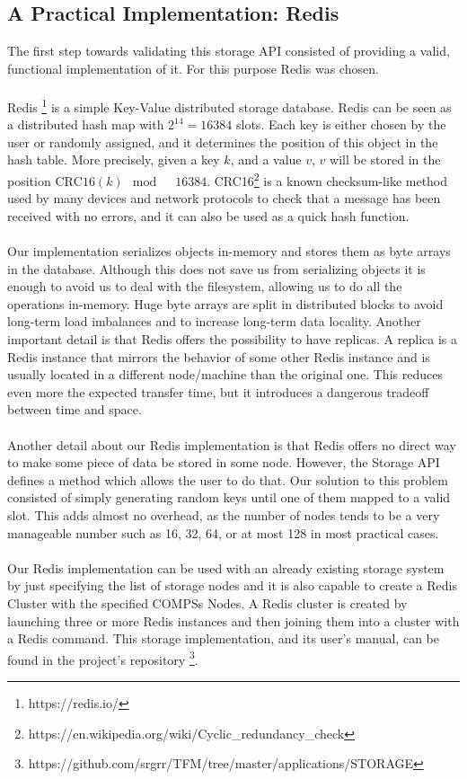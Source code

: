 \subsection{A Practical Implementation: Redis}
\label{subsec:storage_redis}
The first step towards validating this storage API consisted of providing a valid, functional implementation of it. For this purpose Redis was chosen.\\
\\
Redis \footnote{https://redis.io/} is a simple Key-Value distributed storage database. Redis can be seen as a distributed hash map with $2^{14} = 16384$ slots. Each key is either chosen by the user or randomly assigned, and it determines the position of this object in the hash table. More precisely, given a key $k$, and a value $v$, $v$ will be stored in the position $\textrm{CRC16}(k) \mod \quad 16384$. CRC16\footnote{https://en.wikipedia.org/wiki/Cyclic\_redundancy\_check} is a known checksum-like method used by many devices and network protocols to check that a message has been received with no errors, and it can also be used as a quick hash function.\\
\\
Our implementation serializes objects in-memory and stores them as byte arrays in the database. Although this does not save us from serializing objects it is enough to avoid us to deal with the filesystem, allowing us to do all the operations in-memory. Huge byte arrays are split in distributed blocks to avoid long-term load imbalances and to increase long-term data locality. Another important detail is that Redis offers the possibility to have replicas. A replica is a Redis instance that mirrors the behavior of some other Redis instance and is usually located in a different node/machine than the original one. This reduces even more the expected transfer time, but it introduces a dangerous tradeoff between time and space.\\
\\
Another detail about our Redis implementation is that Redis offers no direct way to make some piece of data be stored in some node. However, the Storage API defines a method which allows the user to do that. Our solution to this problem consisted of simply generating random keys until one of them mapped to a valid slot. This adds almost no overhead, as the number of nodes tends to be a very manageable number such as 16, 32, 64, or at most 128 in most practical cases.\\
\\
Our Redis implementation can be used with an already existing storage system by just specifying the list of storage nodes and it is also capable to create a Redis Cluster with the specified COMPSs Nodes. A Redis cluster is created by launching three or more Redis instances and then joining them into a cluster with a Redis command. This storage implementation, and its user's manual, can be found in the project's repository \footnote{https://github.com/srgrr/TFM/tree/master/applications/STORAGE}.

